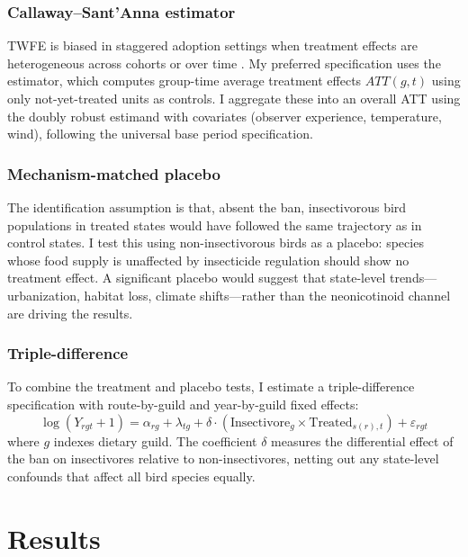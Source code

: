 \documentclass[12pt]{article}
\begin{document}
\subsubsection*{Callaway--Sant'Anna estimator} TWFE is biased in staggered adoption settings when treatment effects are heterogeneous across cohorts or over time \citep{goodman2021difference, callaway2021difference, sun2021estimating}. My preferred specification uses the \citet{callaway2021difference} estimator, which computes group-time average treatment effects $ATT(g,t)$ using only not-yet-treated units as controls. I aggregate these into an overall ATT using the doubly robust estimand with covariates (observer experience, temperature, wind), following the universal base period specification.

\subsubsection*{Mechanism-matched placebo} The identification assumption is that, absent the ban, insectivorous bird populations in treated states would have followed the same trajectory as in control states. I test this using non-insectivorous birds as a placebo: species whose food supply is unaffected by insecticide regulation should show no treatment effect. A significant placebo would suggest that state-level trends---urbanization, habitat loss, climate shifts---rather than the neonicotinoid channel are driving the results.

\subsubsection*{Triple-difference} To combine the treatment and placebo tests, I estimate a triple-difference specification with route-by-guild and year-by-guild fixed effects:
\begin{equation}
\log(Y_{rgt} + 1) = \alpha_{rg} + \lambda_{tg} + \delta \cdot (\text{Insectivore}_g \times \text{Treated}_{s(r),t}) + \varepsilon_{rgt}
\end{equation}
where $g$ indexes dietary guild. The coefficient $\delta$ measures the differential effect of the ban on insectivores relative to non-insectivores, netting out any state-level confounds that affect all bird species equally.


\section{Results}
\end{document}
